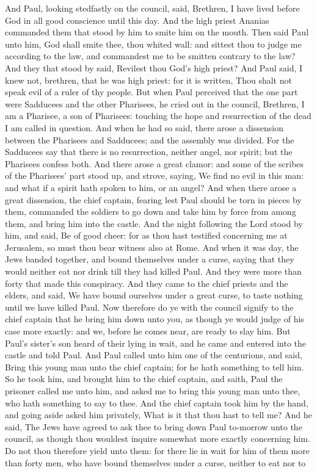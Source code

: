 And Paul, looking stedfastly on the council, said, Brethren, I have lived before God in all good conscience until this day. And the high priest Ananias commanded them that stood by him to smite him on the mouth. Then said Paul unto him, God shall smite thee, thou whited wall: and sittest thou to judge me according to the law, and commandest me to be smitten contrary to the law? And they that stood by said, Revilest thou God’s high priest? And Paul said, I knew not, brethren, that he was high priest: for it is written, Thou shalt not speak evil of a ruler of thy people. But when Paul perceived that the one part were Sadducees and the other Pharisees, he cried out in the council, Brethren, I am a Pharisee, a son of Pharisees: touching the hope and resurrection of the dead I am called in question. And when he had so said, there arose a dissension between the Pharisees and Sadducees; and the assembly was divided. For the Sadducees say that there is no resurrection, neither angel, nor spirit; but the Pharisees confess both. And there arose a great clamor: and some of the scribes of the Pharisees’ part stood up, and strove, saying, We find no evil in this man: and what if a spirit hath spoken to him, or an angel? And when there arose a great dissension, the chief captain, fearing lest Paul should be torn in pieces by them, commanded the soldiers to go down and take him by force from among them, and bring him into the castle.  And the night following the Lord stood by him, and said, Be of good cheer: for as thou hast testified concerning me at Jerusalem, so must thou bear witness also at Rome.  And when it was day, the Jews banded together, and bound themselves under a curse, saying that they would neither eat nor drink till they had killed Paul. And they were more than forty that made this conspiracy. And they came to the chief priests and the elders, and said, We have bound ourselves under a great curse, to taste nothing until we have killed Paul. Now therefore do ye with the council signify to the chief captain that he bring him down unto you, as though ye would judge of his case more exactly: and we, before he comes near, are ready to slay him. But Paul’s sister’s son heard of their lying in wait, and he came and entered into the castle and told Paul. And Paul called unto him one of the centurions, and said, Bring this young man unto the chief captain; for he hath something to tell him. So he took him, and brought him to the chief captain, and saith, Paul the prisoner called me unto him, and asked me to bring this young man unto thee, who hath something to say to thee. And the chief captain took him by the hand, and going aside asked him privately, What is it that thou hast to tell me? And he said, The Jews have agreed to ask thee to bring down Paul to-morrow unto the council, as though thou wouldest inquire somewhat more exactly concerning him. Do not thou therefore yield unto them: for there lie in wait for him of them more than forty men, who have bound themselves under a curse, neither to eat nor to 